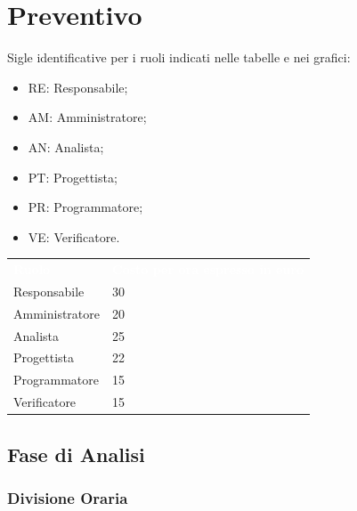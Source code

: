 \section{Preventivo}
Sigle identificative per i ruoli indicati nelle tabelle e nei grafici:
\begin{itemize}
    \item RE: Responsabile;
    \item AM: Amministratore;
    \item AN: Analista;
    \item PT: Progettista;
    \item PR: Programmatore;
    \item VE: Verificatore.
\end{itemize}
{
	
\renewcommand{\arraystretch}{2}
\begin{table}[h!]
\centering
\caption{Tabella con i costi per ogni ruolo}
\begin{longtable}{ C{2cm} C{3cm}}
	\textcolor{white}{\textbf{Ruolo}} & 
	\textcolor{white}{\textbf{Costo per ora espresso in euro}}\\	
			
			Responsabile & 30\\
			Amministratore & 20\\
			Analista & 25\\
			Progettista & 22\\
			Programmatore & 15\\
			Verificatore & 15\\
			
		\end{longtable}
		
	\end{table}

}

\clearpage
\subsection{Fase di Analisi}
\subsubsection{Divisione Oraria}

